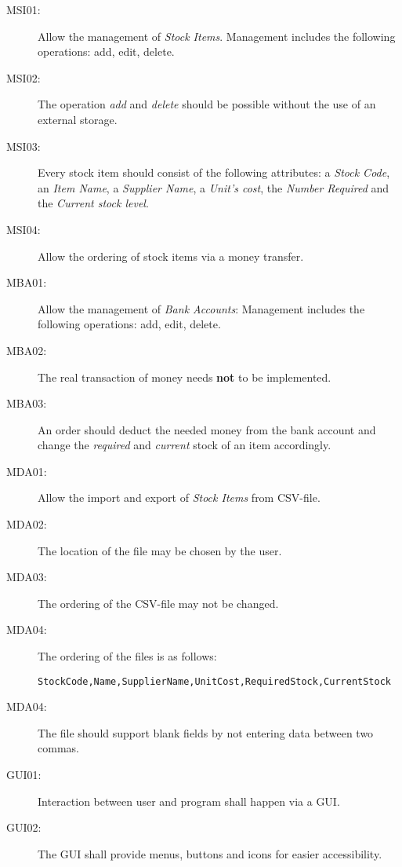 \begin{description}
\item[MSI01:] Allow the management of \textit{Stock Items}. Management includes the following operations: add, edit, delete.
\item[MSI02:] The operation \textit{add} and \textit{delete} should be possible without the use of an external storage.
\item[MSI03:] Every stock item should consist of the following attributes: a \textit{Stock Code}, an \textit{Item Name}, a \textit{Supplier Name}, a \textit{Unit's cost}, the \textit{Number Required} and the \textit{Current stock level}.
\item[MSI04:] Allow the ordering of stock items via a money transfer.
\item[MBA01:] Allow the management of \textit{Bank Accounts}: Management includes the following operations: add, edit, delete.
\item[MBA02:] The real transaction of money needs \textbf{not} to be implemented.
\item[MBA03:] An order should deduct the needed money from the bank account and change the \textit{required} and \textit{current} stock of an item accordingly.
\item[MDA01:] Allow the import and export of \textit{Stock Items} from \ac{CSV}-file.
\item[MDA02:] The location of the file may be chosen by the user.
\item[MDA03:] The ordering of the \ac{CSV}-file may not be changed.
\item[MDA04:] The ordering of the files is as follows:
\begin{lstlisting}
StockCode,Name,SupplierName,UnitCost,RequiredStock,CurrentStock
\end{lstlisting}
\item[MDA04:] The file should support blank fields by not entering data between two commas.
\item[GUI01:] Interaction between user and program shall happen via a \ac{GUI}.
\item[GUI02:] The \ac{GUI} shall provide menus, buttons and icons for easier accessibility.
\end{description}
